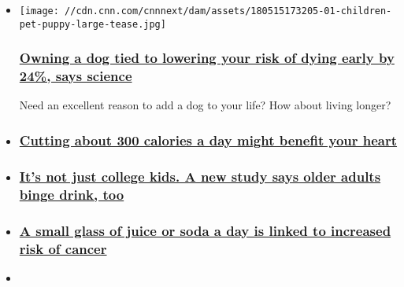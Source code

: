 \begin{itemize}
\item
  \href{/2019/10/08/health/dogs-help-us-live-longer-wellness/index.html}{}

  \texttt{[image: //cdn.cnn.com/cnnnext/dam/assets/180515173205-01-children-pet-puppy-large-tease.jpg]}

  \hypertarget{owning-a-dog-tied-to-lowering-your-risk-of-dying-early-by-24-says-science}{%
  \subsubsection{\texorpdfstring{\href{/2019/10/08/health/dogs-help-us-live-longer-wellness/index.html}{Owning
  a dog tied to lowering your risk of dying early by 24\%, says
  science}}{Owning a dog tied to lowering your risk of dying early by 24\%, says science}}\label{owning-a-dog-tied-to-lowering-your-risk-of-dying-early-by-24-says-science}}

  Need an excellent reason to add a dog to your life? How about living
  longer?
\item
  \hypertarget{cutting-about-300-calories-a-day-might-benefit-your-heart}{%
  \subsubsection{\texorpdfstring{\href{/2019/07/11/health/cut-calories-heart-benefits-study/index.html}{Cutting
  about 300 calories a day might benefit your
  heart}}{Cutting about 300 calories a day might benefit your heart}}\label{cutting-about-300-calories-a-day-might-benefit-your-heart}}
\item
  \hypertarget{its-not-just-college-kids-a-new-study-says-older-adults-binge-drink-too}{%
  \subsubsection{\texorpdfstring{\href{/2019/07/31/health/binge-drinking-adults-study-trnd/index.html}{It's
  not just college kids. A new study says older adults binge drink,
  too}}{It's not just college kids. A new study says older adults binge drink, too}}\label{its-not-just-college-kids-a-new-study-says-older-adults-binge-drink-too}}
\item
  \hypertarget{a-small-glass-of-juice-or-soda-a-day-is-linked-to-increased-risk-of-cancer}{%
  \subsubsection{\texorpdfstring{\href{/2019/07/10/health/sugary-drinks-cancer-risk-study-intl/index.html}{A
  small glass of juice or soda a day is linked to increased risk of
  cancer}}{A small glass of juice or soda a day is linked to increased risk of cancer}}\label{a-small-glass-of-juice-or-soda-a-day-is-linked-to-increased-risk-of-cancer}}
\item
  \hypertarget{climate-crisis-might-be-behind-the-rise-of-mysterious-superbug-c-auris}{%
}
\end{itemize}
